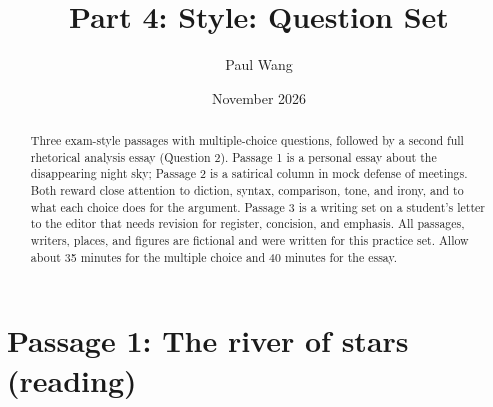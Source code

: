 \documentclass[11pt]{article}
\title{Part 4: Style: Question Set}
\author{Paul Wang}
\date{November 2026}
\begin{document}
\maketitle

\begin{abstract}
Three exam-style passages with multiple-choice questions, followed by a second full rhetorical analysis essay (Question 2). Passage 1 is a personal essay about the disappearing night sky; Passage 2 is a satirical column in mock defense of meetings. Both reward close attention to diction, syntax, comparison, tone, and irony, and to what each choice does for the argument. Passage 3 is a writing set on a student's letter to the editor that needs revision for register, concision, and emphasis. All passages, writers, places, and figures are fictional and were written for this practice set. Allow about 35 minutes for the multiple choice and 40 minutes for the essay.
\end{abstract}


\section{Passage 1: The river of stars (reading)}
\end{document}
